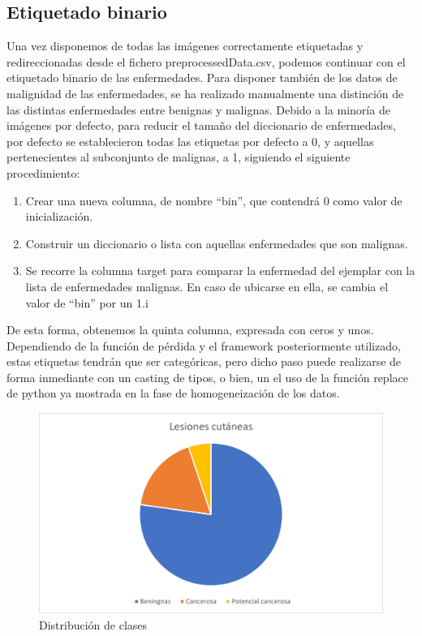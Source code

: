  \subsection{Etiquetado binario}
 
Una vez disponemos de todas las imágenes correctamente etiquetadas y redireccionadas desde el fichero preprocessedData.csv, podemos continuar con el etiquetado binario de las enfermedades. Para disponer también de los datos de malignidad de las enfermedades, se ha realizado manualmente una distinción de las distintas enfermedades entre benignas y malignas. Debido a la minoría de imágenes por defecto, para reducir el tamaño del diccionario de enfermedades, por defecto se establecieron todas las etiquetas por defecto a 0, y aquellas pertenecientes al subconjunto de malignas, a 1, siguiendo el siguiente procedimiento:
 
 \begin{enumerate}
 	\item Crear una nueva columna, de nombre ``bin'', que contendrá 0 como valor de inicialización.
 	\item Construir un diccionario o lista con aquellas enfermedades que son malignas.
 	\item Se recorre la columna target para comparar la enfermedad del ejemplar con la lista de enfermedades malignas. En caso de ubicarse en ella, se cambia el valor de ``bin'' por un 1.i
\end{enumerate}

De esta forma, obtenemos la quinta columna, expresada con ceros y unos. Dependiendo de la función de pérdida y el framework posteriormente utilizado, estas etiquetas tendrán que ser categóricas, pero dicho paso puede realizarse de forma inmediante con un casting de tipos, o bien, un el uso de la función replace de python ya mostrada en la fase de homogeneización de los datos.



\begin{figure}[H]
	\centering
	\includegraphics[scale = 0.7]{imagenes/datasetfinal.png}
	\caption{Distribución de clases}
		\label {tartabinaria}
\end{figure}

